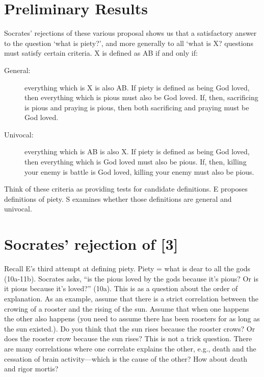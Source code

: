 \documentclass[oneside]{article}
\begin{document}
\section*{Preliminary Results}

Socrates' rejections of these various proposal shows us that a satisfactory answer to the question `what is piety?', and more generally to all `what is X? questions must satisfy certain criteria. X is defined as AB if and only if: 
\begin{description}
\item[General:] everything which is X is also AB. If piety is defined as being God loved, then everything which is pious must also be God loved. If, then, sacrificing is pious and praying is pious, then both sacrificing and praying must be God loved. 
\item[Univocal:] everything which is AB is also X. If piety is defined as being God loved, then everything which is God loved must also be pious. If, then, killing your enemy is battle is God loved, killing your enemy must also be pious. 
\end{description}
Think of these criteria as providing tests for candidate definitions. E proposes definitions of piety. S examines whether those definitions are general and univocal. 


\section*{Socrates' rejection of [3]}
Recall E's third attempt at defining piety. Piety = what is dear to all the gods (10a-11b). Socrates asks, ``is the pious loved by the gods because it's pious? Or is it pious because it's loved?'' (10a). This is as a question about the order of explanation. As an example, assume that there is a strict correlation between the crowing of a rooster and the rising of the sun. Assume that when one happens the other also happens (you need to assume there has been roosters for as long as the sun existed.). Do you think that the sun rises because the rooster crows? Or does the rooster crow because the sun rises? This is not a trick question. There are many correlations where one correlate explains the other, e.g., death and the cessation of brain activity---which is the cause of the other? How about death and rigor mortis?\\
\end{document}
